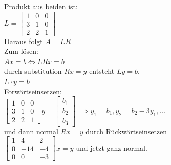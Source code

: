 \documentclass{article}
\begin{document}
	Produkt aus beiden ist:\\
	$L=\begin{bmatrix}1&0&0\\
		3&1&0\\
		2&2&1\end{bmatrix}$\\
	Daraus folgt $A=LR$\\
	Zum lösen:\\
	$Ax = b \iff LRx = b$\\
	durch substitution $Rx = y$ entsteht $Ly = b$.\\
	$L\cdot y = b$\\
	Forwärtseinsetzen:\\
	$\begin{bmatrix}1&0&0\\
		3&1&0\\
		2&2&1\end{bmatrix}y = \begin{bmatrix}b_1\\b_2\\b_3\end{bmatrix}\implies y_1 = b_1, y_2=b_2-3y_1,\dots$\\
	und dann normal $Rx=y$ durch Rückwärtseinsetzen\\
	$\begin{bmatrix}1&4&2\\
		0&-14&-4\\
		0&0&-3\end{bmatrix}x = y$ und jetzt ganz normal.\\
\end{document}
